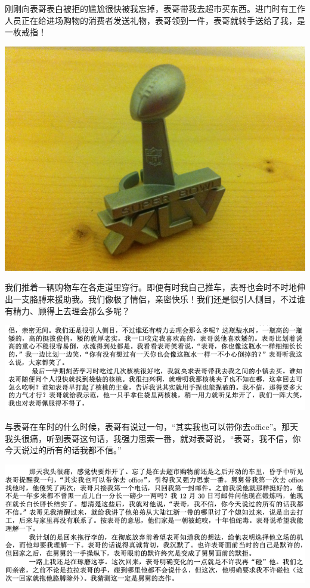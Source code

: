 \documentclass[9pt, b5paper]{article}
\begin{document}
刚刚向表哥表白被拒的尴尬很快被我忘掉，表哥带我去超市买东西。进门时有工作人员正在给进场购物的消费者发送礼物，表哥领到一件，表哥就转手送给了我，是一枚戒指！

\begin{center}
\includegraphics[width=.9\linewidth]{./pic/IMG_0371.JPG}
\end{center}

我们推着一辆购物车在各走道里穿行。即便有时我自己推车，表哥也会时不时地伸出一支胳膊来援助我。我们像极了情侣，亲密快乐！我们还是很引人侧目，不过谁有精力、顾得上去理会那么多呢？

\begin{center}
\includegraphics[width=.9\linewidth]{./pic/p1p50-1.png}
\end{center}  

与表哥在车时的什么时候，表哥有说过一句，“其实我也可以带你去office”。那天我头很痛，听到表哥这句话，我强力思索一番，就对表哥说，“表哥，我不信，你今天说过的所有的话我都不信。”

\begin{center}
\includegraphics[width=.9\linewidth]{./pic/p1p50-2.png}
\end{center}  
\end{document}
